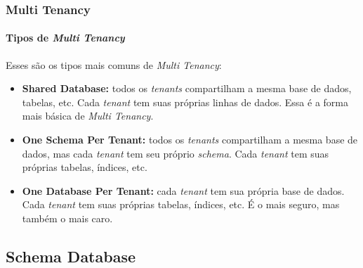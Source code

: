 \documentclass[
	9pt, %
	t, %
]{beamer}
\begin{document}
\begin{frame}
	\frametitle{Multi Tenancy}
	\framesubtitle{Tipos de \textit{Multi Tenancy}}

	Esses são os tipos mais comuns de \textit{Multi Tenancy}:

	\begin{itemize}
		\item \textbf{Shared Database:} todos os \textit{tenants} compartilham a mesma base de dados, tabelas, etc. Cada \textit{tenant} tem suas próprias linhas de dados. Essa é a forma mais básica de \textit{Multi Tenancy}.
		\item \textbf{One Schema Per Tenant:} todos os \textit{tenants} compartilham a mesma base de dados, mas cada \textit{tenant} tem seu próprio \textit{schema}. Cada \textit{tenant} tem suas próprias tabelas, índices, etc.
		\item \textbf{One Database Per Tenant:} cada \textit{tenant} tem sua própria base de dados. Cada \textit{tenant} tem suas próprias tabelas, índices, etc. É o mais seguro, mas também o mais caro.
	\end{itemize}


\end{frame}

\subsection{Schema Database}
\end{document}
